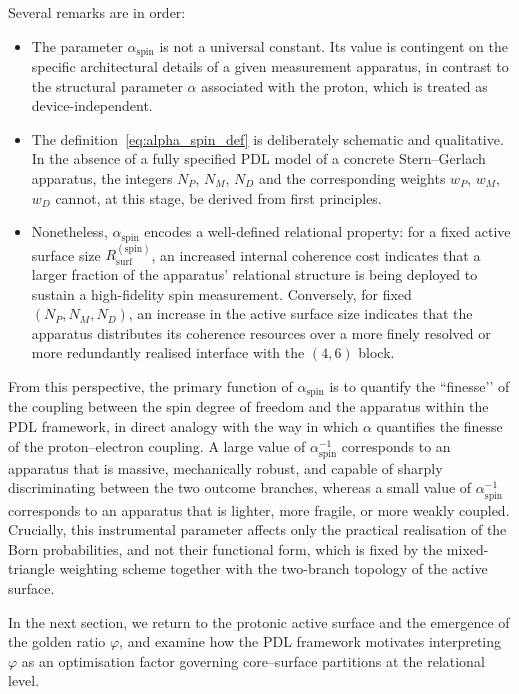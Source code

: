 \documentclass[11pt,a4paper]{article}
\numberwithin{equation}{section}
\begin{document}
Several remarks are in order:
\begin{itemize}
  \item The parameter $\alpha_{\mathrm{spin}}$ is not a universal constant. Its value is contingent on the specific architectural details of a given measurement apparatus, in contrast to the structural parameter $\alpha$ associated with the proton, which is treated as device-independent.
  \item The definition~\eqref{eq:alpha_spin_def} is deliberately schematic and qualitative. In the absence of a fully specified PDL model of a concrete Stern--Gerlach apparatus, the integers $N_P$, $N_M$, $N_D$ and the corresponding weights $w_P$, $w_M$, $w_D$ cannot, at this stage, be derived from first principles.
  \item Nonetheless, $\alpha_{\mathrm{spin}}$ encodes a well-defined relational property: for a fixed active surface size $R_{\mathrm{surf}}^{(\mathrm{spin})}$, an increased internal coherence cost indicates that a larger fraction of the apparatus’ relational structure is being deployed to sustain a high-fidelity spin measurement. Conversely, for fixed $(N_P,N_M,N_D)$, an increase in the active surface size indicates that the apparatus distributes its coherence resources over a more finely resolved or more redundantly realised interface with the $(4,6)$ block.
\end{itemize}

From this perspective, the primary function of $\alpha_{\mathrm{spin}}$ is to quantify the “finesse’’ of the coupling between the spin degree of freedom and the apparatus within the PDL framework, in direct analogy with the way in which $\alpha$ quantifies the finesse of the proton–electron coupling. A large value of $\alpha_{\mathrm{spin}}^{-1}$ corresponds to an apparatus that is massive, mechanically robust, and capable of sharply discriminating between the two outcome branches, whereas a small value of $\alpha_{\mathrm{spin}}^{-1}$ corresponds to an apparatus that is lighter, more fragile, or more weakly coupled. Crucially, this instrumental parameter affects only the practical realisation of the Born probabilities, and not their functional form, which is fixed by the mixed-triangle weighting scheme together with the two-branch topology of the active surface.

In the next section, we return to the protonic active surface and the emergence of the golden ratio $\varphi$, and examine how the PDL framework motivates interpreting $\varphi$ as an optimisation factor governing core–surface partitions at the relational level.
\end{document}
